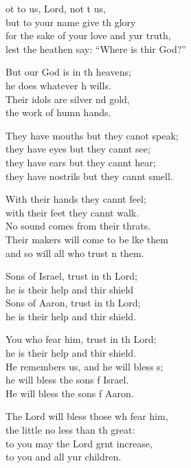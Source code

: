 \settowidth{\versewidth}{for the sake of your love and your truth, *}
\begin{psalmverse}%
  \begin{patverse}
ot to us, Lord, not t us,\Med\\
but to your name give th glory\\
for the sake of your love and yur truth,\Med\\
lest the heathen say: “Where is thir God?”

But our God is in th heavens;\Med\\
he does whatever h wills.\\
Their idols are silver nd gold,\Med\\
the work of humn hands.

They have mouths but they canot speak;\Med\\
they have eyes but they cannt see;\\
they have ears but they cannt hear;\Med\\
they have nostrils but they cannt smell.

With their hands they cannt feel;\Flex\\
with their feet they cannt walk.\Med\\
No sound comes from their thrats.\\
Their makers will come to be l\pointup{\i}ke them\Med\\
and so will all who trust \pointup{\i}n them.

Sons of Israel, trust in th Lord;\Med\\
he is their help and thir shield\\
Sons of Aaron, trust in th Lord;\Med\\
he is their help and thir shield.

You who fear him, trust in th Lord;\Med\\
he is their help and thir shield.\\
He remembers us, and he will bless s;\Flex\\
he will bless the sons f Israel.\Med\\
He will bless the sons f Aaron.

The Lord will bless those wh fear him,\Med\\
the little no less than th great:\\
to you may the Lord grnt increase,\Med\\
to you and all yur children.


\end{patverse}
\end{psalmverse}
